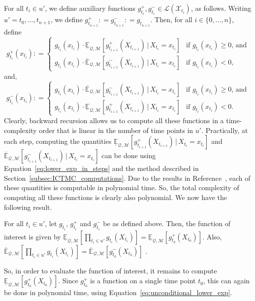 \documentclass[twoside,11pt]{article}
\newcommand{\states}{\mathcal{X}}
\newcommand{\lexp}{\underline{\mathbb{E}}_{\rateset,\mathcal{M}}}
\newcommand{\uexp}{\overline{\mathbb{E}}_{\rateset,\mathcal{M}}}
\newcommand{\gambles}{\mathcal{L}}
\newcommand{\rateset}{\mathcal{Q}}
\newcommand{\coloneqq}{:\!=}
\begin{document}
For all $t_i\in u'$, we define auxiliary functions $g_{t_i}^+,g_{t_i}^-\in\gambles(\states_{t_i})$, as follows. Writing $u'=t_0,\ldots,t_{n+1}$, we define $g_{t_{n+1}}^+\coloneqq g_{t_{n+1}}^-\coloneqq g_{t_{n+1}}$. Then, for all $i\in\{0,\ldots,n\}$, define
\begin{equation*}
g_{t_i}^+(x_{t_i}) \coloneqq \left\{\begin{array}{ll}
g_{t_i}(x_{t_i})\cdot\lexp[g_{t_{i+1}}^+(X_{t_{i+1}})\,\vert\, X_{t_i}=x_{t_i}] & \text{if $g_{t_i}(x_{t_i})\geq 0$, and} \\
g_{t_i}(x_{t_i})\cdot\uexp[g_{t_{i+1}}^-(X_{t_{i+1}})\,\vert\, X_{t_i}=x_{t_i}] & \text{if $g_{t_i}(x_{t_i})<0$,}
\end{array}\right.
\end{equation*}
and,
\begin{equation*}
g_{t_i}^-(x_{t_i}) \coloneqq \left\{\begin{array}{ll}
g_{t_i}(x_{t_i})\cdot\uexp[g_{t_{i+1}}^-(X_{t_{i+1}})\,\vert\, X_{t_i}=x_{t_i}] & \text{if $g_{t_i}(x_{t_i})\geq 0$, and} \\
g_{t_i}(x_{t_i})\cdot\lexp[g_{t_{i+1}}^+(X_{t_{i+1}})\,\vert\, X_{t_i}=x_{t_i}] & \text{if $g_{t_i}(x_{t_i})<0$.}
\end{array}\right.
\end{equation*}
Clearly, backward recursion allows us to compute all these functions in a time-complexity order that is linear in the number of time points in $u'$. Practically, at each step, computing the quantities $\lexp[g_{t_{i+1}}^+(X_{t_{i+1}})\,\vert\, X_{t_i}=x_{t_i}]$ and $\uexp[g_{t_{i+1}}^-(X_{t_{i+1}})\,\vert\, X_{t_i}=x_{t_i}]$ can be done using Equation~\eqref{eq:lower_exp_in_steps} and the method described in Section~\ref{subsec:ICTMC_computations}. Due to the results in Reference~\citep{krak2016ictmc}, each of these quantities is computable in polynomial time. So, the total complexity of computing all these functions is clearly also polynomial. We now have the following result.
\begin{proposition}\label{prop:computing_product_funcs}
For all $t_i\in u'$, let $g_{t_i}$, $g_{t_i}^+$ and $g_{t_i}^-$ be as defined above. Then, the function of interest is given by
$\lexp\left[\prod_{t_i\in u'}g_{t_i}(X_{t_i})\right] = \lexp\left[g_{t_0}^+(X_{t_0})\right]$. Also,
$\uexp\left[\prod_{t_i\in u'}g_{t_i}(X_{t_i})\right]=\uexp\left[g_{t_0}^-(X_{t_0})\right]$%
.
\end{proposition}
So, in order to evaluate the function of interest, it remains to compute $\lexp\left[g_{t_0}^+(X_{t_0})\right]$. Since $g_{t_0}^+$ is a function on a single time point $t_0$, this can again be done in polynomial time, using Equation~\eqref{eq:unconditional_lower_exp}.
\end{document}
